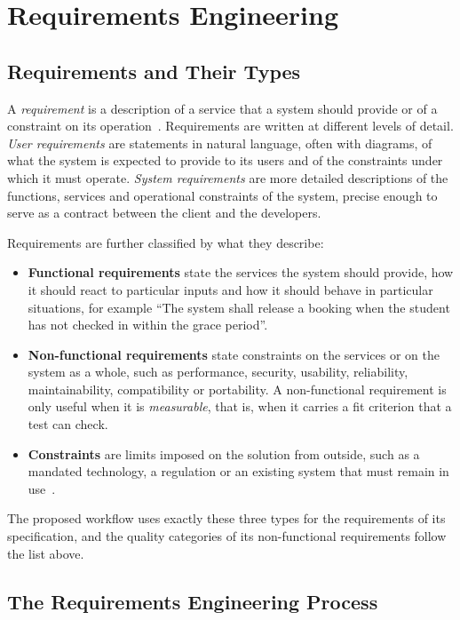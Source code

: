 \section{Requirements Engineering}
\label{sec:bg-re}

\subsection{Requirements and Their Types}
\label{sec:bg-requirement-types}

A \emph{requirement} is a description of a service that a system should provide or of a constraint on its operation~\cite{sommerville2015software}. Requirements are written at different levels of detail. \emph{User requirements} are statements in natural language, often with diagrams, of what the system is expected to provide to its users and of the constraints under which it must operate. \emph{System requirements} are more detailed descriptions of the functions, services and operational constraints of the system, precise enough to serve as a contract between the client and the developers.

Requirements are further classified by what they describe:
\begin{itemize}
    \item \textbf{Functional requirements} state the services the system should provide, how it should react to particular inputs and how it should behave in particular situations, for example ``The system shall release a booking when the student has not checked in within the grace period''.
    \item \textbf{Non-functional requirements} state constraints on the services or on the system as a whole, such as performance, security, usability, reliability, maintainability, compatibility or portability. A non-functional requirement is only useful when it is \emph{measurable}, that is, when it carries a fit criterion that a test can check.
    \item \textbf{Constraints} are limits imposed on the solution from outside, such as a mandated technology, a regulation or an existing system that must remain in use~\cite{iso29148}.
\end{itemize}

The proposed workflow uses exactly these three types for the requirements of its specification, and the quality categories of its non-functional requirements follow the list above.

\subsection{The Requirements Engineering Process}
\label{sec:bg-re-process}

